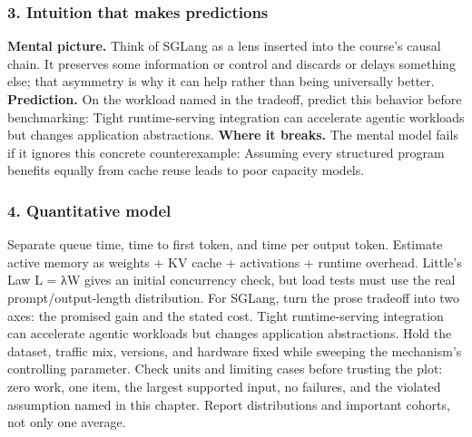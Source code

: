 \subsubsection*{3. Intuition that makes predictions}
\textbf{Mental picture.} Think of SGLang as a lens inserted into the course's causal chain. It preserves some information or control and discards or delays something else; that asymmetry is why it can help rather than being universally better.
\textbf{Prediction.} On the workload named in the tradeoff, predict this behavior before benchmarking: Tight runtime-serving integration can accelerate agentic workloads but changes application abstractions.
\textbf{Where it breaks.} The mental model fails if it ignores this concrete counterexample: Assuming every structured program benefits equally from cache reuse leads to poor capacity models.
\subsubsection*{4. Quantitative model}
Separate queue time, time to first token, and time per output token. Estimate active memory as weights + KV cache + activations + runtime overhead. Little's Law L = λW gives an initial concurrency check, but load tests must use the real prompt/output-length distribution.
For SGLang, turn the prose tradeoff into two axes: the promised gain and the stated cost. Tight runtime-serving integration can accelerate agentic workloads but changes application abstractions. Hold the dataset, traffic mix, versions, and hardware fixed while sweeping the mechanism's controlling parameter.
Check units and limiting cases before trusting the plot: zero work, one item, the largest supported input, no failures, and the violated assumption named in this chapter. Report distributions and important cohorts, not only one average.
